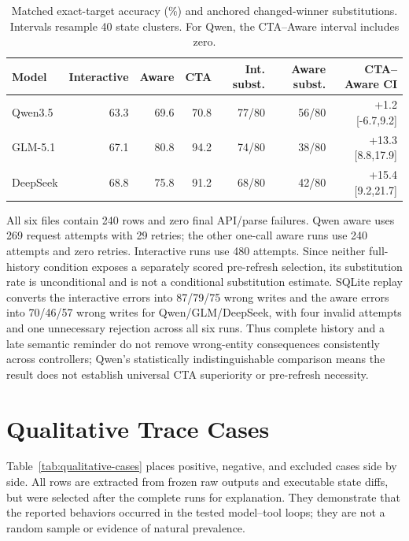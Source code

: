 \documentclass[10pt]{article}
\begin{document}
\begin{table}[h]
\centering
\scriptsize
\setlength{\tabcolsep}{3pt}
\begin{tabular}{lrrrrrr}
\toprule
Model & Interactive & Aware & CTA & Int. subst. & Aware subst. & CTA--Aware CI \\
\midrule
Qwen3.5 & 63.3 & 69.6 & 70.8 & 77/80 & 56/80 & +1.2 [-6.7,9.2] \\
GLM-5.1 & 67.1 & 80.8 & 94.2 & 74/80 & 38/80 & +13.3 [8.8,17.9] \\
DeepSeek & 68.8 & 75.8 & 91.2 & 68/80 & 42/80 & +15.4 [9.2,21.7] \\
\bottomrule
\end{tabular}
\caption{Matched \NewSchemaReplication{} exact-target accuracy (\%) and anchored changed-winner substitutions.
Intervals resample 40 state clusters. For Qwen, the CTA--Aware interval includes zero.}
\end{table}

All six files contain 240 rows and zero final API/parse failures. Qwen aware uses 269 request
attempts with 29 retries; the other one-call aware runs use 240 attempts and zero retries.
Interactive runs use 480 attempts. Since neither full-history condition exposes a separately
scored pre-refresh selection, its substitution rate is unconditional and is not a conditional
substitution estimate.
SQLite replay converts the interactive errors into 87/79/75 wrong writes and the aware errors
into 70/46/57 wrong writes for Qwen/GLM/DeepSeek, with four invalid attempts and one unnecessary
rejection across all six runs. Thus complete history and a late semantic reminder do not remove
wrong-entity consequences consistently across controllers; Qwen's statistically indistinguishable
comparison means the result does not
establish universal CTA superiority or pre-refresh necessity.

\section{Qualitative Trace Cases}
Table~\ref{tab:qualitative-cases} places positive, negative, and excluded cases side by side.
All rows are extracted from frozen raw outputs and executable state diffs, but were selected after
the complete runs for explanation. They demonstrate that the reported behaviors occurred in the
tested model--tool loops; they are not a random sample or evidence of natural prevalence.
\end{document}
